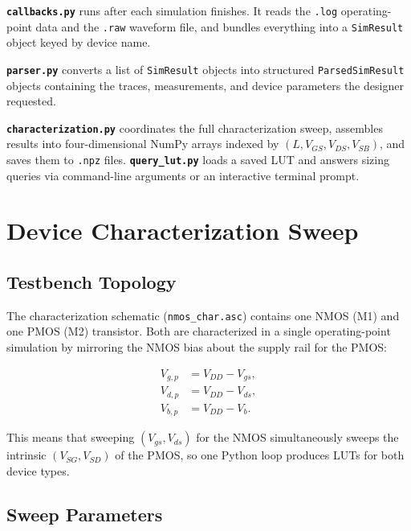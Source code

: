 \documentclass[conference]{IEEEtran}
\begin{document}
\textbf{\texttt{callbacks.py}} runs after each simulation finishes.  It
reads the \texttt{.log} operating-point data and the \texttt{.raw} waveform
file, and bundles everything into a \texttt{SimResult} object keyed by
device name.

\textbf{\texttt{parser.py}} converts a list of \texttt{SimResult} objects
into structured \texttt{ParsedSimResult} objects containing the traces,
measurements, and device parameters the designer requested.

\textbf{\texttt{characterization.py}} coordinates the full characterization
sweep, assembles results into four-dimensional NumPy arrays indexed by
$(L, V_{GS}, V_{DS}, V_{SB})$, and saves them to \texttt{.npz} files.
\textbf{\texttt{query\_lut.py}} loads a saved LUT and answers sizing
queries via command-line arguments or an interactive terminal prompt.

\section{Device Characterization Sweep}
\label{sec:characterization}

\subsection{Testbench Topology}

The characterization schematic (\texttt{nmos\_char.asc}) contains one NMOS
(M1) and one PMOS (M2) transistor.  Both are characterized in a single
operating-point simulation by mirroring the NMOS bias about the supply rail
for the PMOS:

\begin{align}
  V_{g,p} &= V_{DD} - V_{gs}, \\
  V_{d,p} &= V_{DD} - V_{ds}, \\
  V_{b,p} &= V_{DD} - V_b.
\end{align}

This means that sweeping $(V_{gs}, V_{ds})$ for the NMOS simultaneously
sweeps the intrinsic $(V_{SG}, V_{SD})$ of the PMOS, so one Python loop
produces LUTs for both device types.

\subsection{Sweep Parameters}
\end{document}
